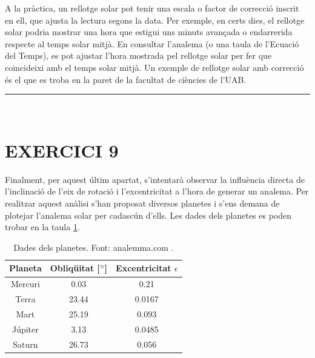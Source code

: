 \documentclass[a4paper, 11pt]{article}
\begin{document}
\vspace{2mm}

\noindent A la pràctica, un rellotge solar pot tenir una escala o factor de correcció inscrit en ell, que ajusta la lectura segons la data. Per exemple, en certs dies, el rellotge solar podria mostrar una hora que estigui uns minuts avançada o endarrerida respecte al temps solar mitjà. En consultar l'analema (o una taula de l'Ecuació del Temps), es pot ajustar l'hora mostrada pel rellotge solar per fer que coincideixi amb el temps solar mitjà. Un exemple de rellotge solar amb correcció és el que es troba en la paret de la facultat de ciències de l'UAB. 
\vspace{10mm}
\hrule\
\vspace{5mm}


\section*{EXERCICI 9}

\noindent Finalment, per aquest últim apartat, s'intentarà observar la influència directa de l'inclinació de l'eix de rotació i l'excentricitat a l'hora de generar un analema. Per realitzar aquest anàlisi s'han proposat diversos planetes i s'ens demana de plotejar l'analema solar per cadascún d'ells. Les dades dels planetes es poden trobar en la taula \ref{tab:planetes}.

\vspace{2mm}
\begin{table}[h!]
    \centering
    \begin{tabular}{|c|c|c|}
        \hline
        Planeta & Obliqüitat [$\degree$] & Excentricitat $\epsilon$ \\
        \hline
        Mercuri & 0.03 & 0.21 \\
        Terra & 23.44 & 0.0167 \\
        Mart & 25.19 & 0.093 \\
        Júpiter & 3.13 & 0.0485 \\
        Saturn & 26.73 & 0.056 \\
        \hline
    \end{tabular}
    \caption{Dades dels planetes. Font: analemma.com \cite{PLANETES}.}
    \label{tab:planetes}
\end{table}
\vspace{2mm}
\end{document}
